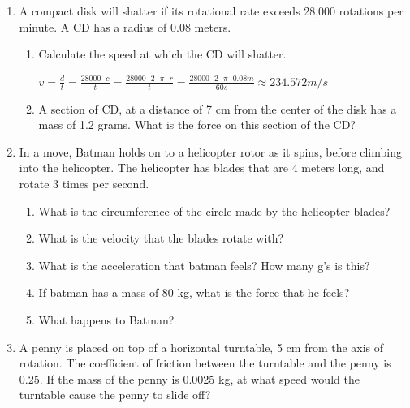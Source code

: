 \documentclass[letterpaper, 12pt]{article}
\begin{document}
\begin{enumerate}
\begin{enumerate}
	\end{enumerate}
	
	\item A compact disk will shatter if its rotational rate exceeds 28,000 rotations per minute.  A CD has a radius of 0.08 meters.
		\begin{enumerate}
			\item Calculate the speed at which the CD will shatter.
				
			\color{red}
			\begin{center}
				\vspace{.25in} 	
				$ v = \frac{d}{t} = \frac{28000 \cdot c} {t} = \frac{28000 \cdot 2 \cdot \pi \cdot r}{t} = \frac{28000 \cdot 2 \cdot \pi \cdot 0.08m}{60s} \approx 234.572 m/s  	$
			\end{center}
			\color{black}
			\vspace{.25in} 	
				
				
			\item A section of CD, at a distance of 7 cm from the center of the disk has a mass of 1.2 grams. What is the force on this section of the CD?
				\vspace{1in}
		\end{enumerate}
	
	\item In a move, Batman holds on to a helicopter rotor as it spins, before climbing into the helicopter. The helicopter has blades that are 4 meters long, and rotate 3 times per second.  
	\begin{enumerate}
		\item What is the circumference of the circle made by the helicopter blades?   
			\vspace{0.75in}
		\item 	What is the velocity that the blades rotate with?		
			\vspace{0.75in}
		\item What is the acceleration that batman feels?  How many g's is this?
			\vspace{0.75in}
		\item If batman has a mass of 80 kg, what is the force that he feels?
			\vspace{0.75in}
		\item What happens to Batman?	
			\vspace{0.75in}
	\end{enumerate}
	
	\item A penny is placed on top of a horizontal turntable, 5 cm from the axis of rotation.  The coefficient of friction between the turntable and the penny is 0.25.  If the mass of the penny is 0.0025 kg, at what speed would the turntable cause the penny to slide off?
	



\end{enumerate}
 
\end{document}
